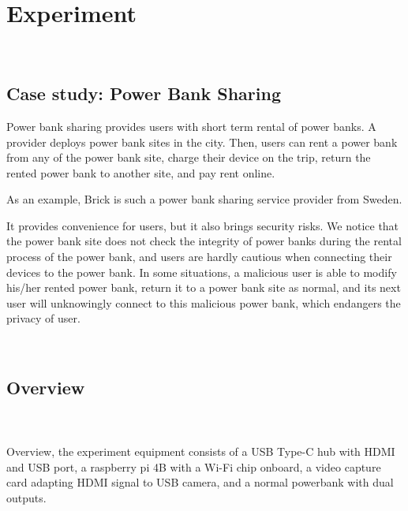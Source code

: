 \section{Experiment}
\label{sec:experiment}
\noindent{}\\

\subsection{Case study: Power Bank Sharing}

Power bank sharing provides users with short term rental of power banks. A provider deploys power bank sites in the city. Then, users can rent a power bank from any of the power bank site, charge their device on the trip, return the rented power bank to another site, and pay rent online.


As an example, Brick is such a power bank sharing service provider from Sweden. 


It provides convenience for users, but it also brings security risks. We notice that the power bank site does not check the integrity of power banks during the rental process of the power bank, and users are hardly cautious when connecting their devices to the power bank. In some situations, a malicious user is able to modify his/her rented power bank, return it to a power bank site as normal, and its next user will unknowingly connect to this malicious power bank, which endangers the privacy of user.


\\

\subsection{Overview}

\\
\\
Overview, the experiment equipment consists of
a USB Type-C hub with HDMI and USB port,
a raspberry pi 4B with a Wi-Fi chip onboard,
a video capture card adapting HDMI signal to USB camera,
and a normal powerbank with dual outputs.

